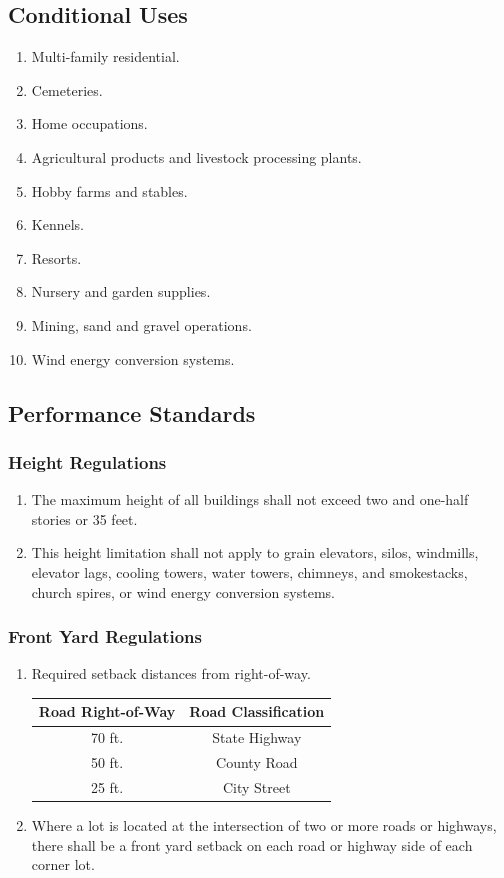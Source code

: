 \subsection{Conditional Uses}
\begin{enumerate}[{\indent}1)]
    \item Multi-family residential.
    \item Cemeteries.
    \item Home occupations.
    \item Agricultural products and livestock processing plants.
    \item Hobby farms and stables.
    \item Kennels.
    \item Resorts.
    \item Nursery and garden supplies.
    \item Mining, sand and gravel operations.
    \item Wind energy conversion systems.
\end{enumerate}
\subsection{Performance Standards}
\subsubsection{Height Regulations}
\begin{enumerate}[{\indent}a)]
    \item The maximum height of all buildings shall not exceed two and one-half stories or 35 feet.
    \item This height limitation shall not apply to grain elevators, silos, windmills, elevator lags, cooling towers, water towers, chimneys, and smokestacks, church spires, or wind energy conversion systems.
\end{enumerate}
\subsubsection{Front Yard Regulations}
\begin{enumerate}[{\indent}a)]
    \item Required setback distances from right-of-way.
        \begin{center}
        \begin{tabular}{|c|c|}
            \hline
            \textbf{Road Right-of-Way} & \textbf{Road Classification}\\
            \hline
            70 ft. & State Highway\\
            \hline
            50 ft. & County Road\\
            \hline
            25 ft. & City Street\\
            \hline
        \end{tabular}
        \end{center}
    \item Where a lot is located at the intersection of two or more roads or highways, there shall be a front yard setback on each road or highway side of each corner lot.
\end{enumerate}
